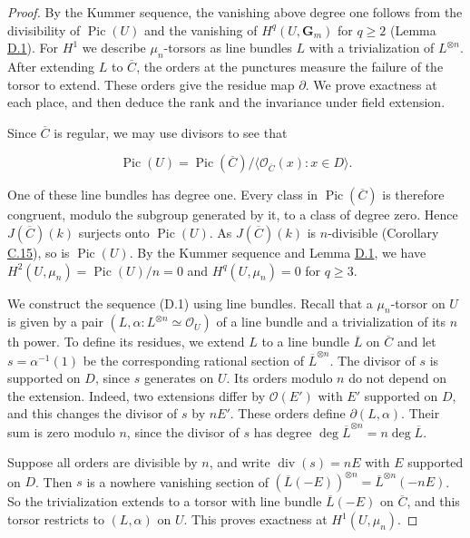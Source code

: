 \documentclass[11pt]{article}
\begin{document}
\begin{proof}[{Proof}]\label{bp185}%
By the Kummer sequence, the vanishing above degree one follows from the divisibility of \(\operatorname{Pic}(U)\) and the vanishing of \(H^q(U,\mathbf G_m)\) for \(q\geq2\) (Lemma \hyperref[bp176]{D.1}). For \(H^1\) we describe \(\mu_n\)-torsors as line bundles \(L\) with a trivialization of \(L^{\otimes n}\). After extending \(L\) to \(\overline C\), the orders at the punctures measure the failure of the torsor to extend. These orders give the residue map \(\partial\). We prove exactness at each place, and then deduce the rank and the invariance under field extension.

Since \(\overline C\) is regular, we may use divisors to see that

\[
\operatorname{Pic}(U)=\operatorname{Pic}(\overline C)/
\langle\mathcal O_{\overline C}(x):x\in D\rangle.
\]

One of these line bundles has degree one. Every class in \(\operatorname{Pic}(\overline C)\) is therefore congruent, modulo the subgroup generated by it, to a class of degree zero. Hence \(J(\overline C)(k)\) surjects onto \(\operatorname{Pic}(U)\). As \(J(\overline C)(k)\) is \(n\)-divisible (Corollary \hyperref[bp163]{C.15}), so is \(\operatorname{Pic}(U)\). By the Kummer sequence and Lemma \hyperref[bp176]{D.1}, we have \(H^2(U,\mu_n)=\operatorname{Pic}(U)/n=0\) and \(H^q(U,\mu_n)=0\) for \(q\geq3\).

We construct the sequence (D.1) using line bundles.  Recall that a \(\mu_n\)-torsor on \(U\) is given by a pair \((L,\alpha:L^{\otimes n}\simeq\mathcal O_U)\) of a line bundle and a trivialization of its \(n\)th power.  To define its residues, we extend \(L\) to a line bundle \(\overline L\) on \(\overline C\) and let \(s=\alpha^{-1}(1)\) be the corresponding rational section of \(\overline L^{\otimes n}\).  The divisor of \(s\) is supported on \(D\), since \(s\) generates on \(U\). Its orders modulo \(n\) do not depend on the extension. Indeed, two extensions differ by \(\mathcal O(E')\) with \(E'\) supported on \(D\), and this changes the divisor of \(s\) by \(nE'\). These orders define \(\partial(L,\alpha)\). Their sum is zero modulo \(n\), since the divisor of \(s\) has degree \(\deg\overline L^{\otimes n}=n\deg\overline L\).

Suppose all orders are divisible by \(n\), and write \(\operatorname{div}(s)=nE\) with \(E\) supported on \(D\). Then \(s\) is a nowhere vanishing section of \((\overline L(-E))^{\otimes n}=\overline L^{\otimes n}(-nE)\). So the trivialization extends to a torsor with line bundle \(\overline L(-E)\) on \(\overline C\), and this torsor restricts to \((L,\alpha)\) on \(U\). This proves exactness at \(H^1(U,\mu_n)\).


\end{proof}
\end{document}
